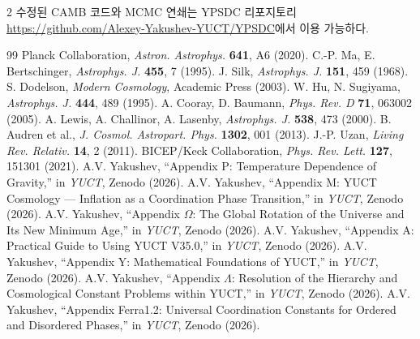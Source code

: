 \documentclass[11pt,a4paper]{article}
\begin{document}
\begin{multicols}{2}
		수정된 CAMB 코드와 MCMC 연쇄는 YPSDC 리포지토리 \url{https://github.com/Alexey-Yakushev-YUCT/YPSDC}에서 이용 가능하다.
		
		\begin{thebibliography}{99}
			 Planck Collaboration, \emph{Astron. Astrophys.} \textbf{641}, A6 (2020).
			 C.-P. Ma, E. Bertschinger, \emph{Astrophys. J.} \textbf{455}, 7 (1995).
			 J. Silk, \emph{Astrophys. J.} \textbf{151}, 459 (1968).
			 S. Dodelson, \emph{Modern Cosmology}, Academic Press (2003).
			 W. Hu, N. Sugiyama, \emph{Astrophys. J.} \textbf{444}, 489 (1995).
			 A. Cooray, D. Baumann, \emph{Phys. Rev. D} \textbf{71}, 063002 (2005).
			 A. Lewis, A. Challinor, A. Lasenby, \emph{Astrophys. J.} \textbf{538}, 473 (2000).
			 B. Audren et al., \emph{J. Cosmol. Astropart. Phys.} \textbf{1302}, 001 (2013).
			 J.-P. Uzan, \emph{Living Rev. Relativ.} \textbf{14}, 2 (2011).
			 BICEP/Keck Collaboration, \emph{Phys. Rev. Lett.} \textbf{127}, 151301 (2021).
			 A.V. Yakushev, ``Appendix P: Temperature Dependence of Gravity,'' in \emph{YUCT}, Zenodo (2026).
			 A.V. Yakushev, ``Appendix M: YUCT Cosmology — Inflation as a Coordination Phase Transition,'' in \emph{YUCT}, Zenodo (2026).
			 A.V. Yakushev, ``Appendix $\Omega$: The Global Rotation of the Universe and Its New Minimum Age,'' in \emph{YUCT}, Zenodo (2026).
			 A.V. Yakushev, ``Appendix A: Practical Guide to Using YUCT V35.0,'' in \emph{YUCT}, Zenodo (2026).
			 A.V. Yakushev, ``Appendix Y: Mathematical Foundations of YUCT,'' in \emph{YUCT}, Zenodo (2026).
			 A.V. Yakushev, ``Appendix $\Lambda$: Resolution of the Hierarchy and Cosmological Constant Problems within YUCT,'' in \emph{YUCT}, Zenodo (2026).
			 A.V. Yakushev, ``Appendix Ferra1.2: Universal Coordination Constants for Ordered and Disordered Phases,'' in \emph{YUCT}, Zenodo (2026).
		\end{thebibliography}
		
	\end{multicols}
\end{document}
